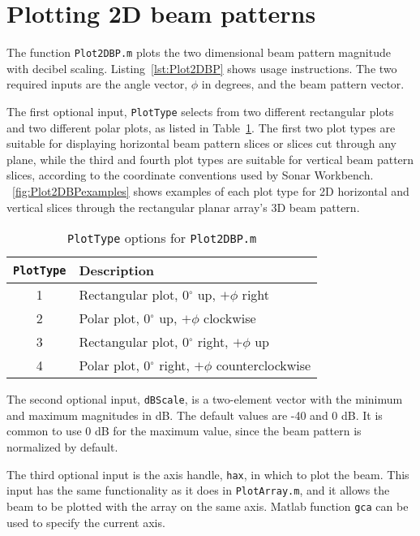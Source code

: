 \section{Plotting 2D beam patterns}

The function \texttt{Plot2DBP.m} plots the two dimensional beam pattern magnitude with decibel scaling. Listing~\ref{lst:Plot2DBP} shows usage instructions. The two required inputs are the angle vector, $\phi$ in degrees, and the beam pattern vector.

The first optional input, \texttt{PlotType} selects from two different rectangular plots and two different polar plots, as listed in Table~\ref{tab:Plot2DBPlotType}. The first two plot types are suitable for displaying horizontal beam pattern slices or slices cut through any plane, while the third and fourth plot types are suitable for vertical beam pattern slices, according to the coordinate conventions used by Sonar Workbench. \figurename~\ref{fig:Plot2DBPexamples} shows examples of each plot type for 2D horizontal and vertical slices through the rectangular planar array's 3D beam pattern.

\begin{table}[!ht]
	\begin{center}
		\caption{\texttt{PlotType} options for \texttt{Plot2DBP.m}}
		\label{tab:Plot2DBPlotType}
		\begin{tabular}{c|l} 
			\texttt{PlotType} & \textbf{Description} \\
			\hline
			1 & Rectangular plot, 0$^\circ$ up, $+\phi$ right \\
			2 & Polar plot, 0$^\circ$ up, $+\phi$ clockwise \\
			3 & Rectangular plot, 0$^\circ$ right, $+\phi$ up \\
			4 & Polar plot, 0$^\circ$ right, $+\phi$ counterclockwise \\
		\end{tabular}
	\end{center}
\end{table}

The second optional input, \texttt{dBScale}, is a two-element vector with the minimum and maximum magnitudes in dB. The default values are -40 and 0 dB. It is common to use 0 dB for the maximum value, since the beam pattern is normalized by default.

The third optional input is the axis handle, \texttt{hax}, in which to plot the beam. This input has the same functionality as it does in \texttt{PlotArray.m}, and it allows the beam to be plotted with the array on the same axis. Matlab function \texttt{gca} can be used to specify the current axis.

